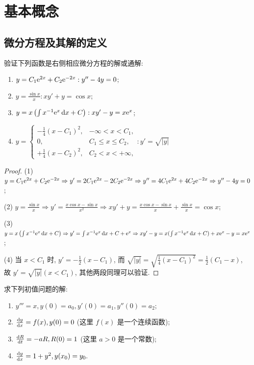 \chapter{基本概念}



\section{微分方程及其解的定义}



\begin{exercise}
  验证下列函数是右侧相应微分方程的解或通解:
  \begin{enumerate}[(1)]
  \item $y=C_1\mathrm{e}^{2x}+C_2\mathrm{e}^{-2x}:y''-4y=0$;
  \item $\displaystyle y=\frac{\sin x}{x}:xy'+y=\cos x$;
  \item $y=x\left(\int x^{-1}\mathrm{e}^x\mathop{}\!\mathrm{d} x+C\right):xy'-y=x\mathrm{e}^x$;
  \item $y=\begin{cases}-\frac{1}{4}(x-C_1)^2,&-\infty<x<C_1,\\0,&C_1\leq x\leq C_2,\\+\frac{1}{4}(x-C_2)^2,&C_2<x<+\infty,\end{cases}:y'=\sqrt{|y|}$
  \end{enumerate}
\end{exercise}

\begin{proof}
  (1) $y=C_1\mathrm{e}^{2x}+C_2\mathrm{e}^{-2x}\Rightarrow y'=2C_1\mathrm{e}^{2x}-2C_2\mathrm{e}^{-2x}\Rightarrow y''=4C_1\mathrm{e}^{2x}+4C_2\mathrm{e}^{-2x}\Rightarrow y''-4y=0$;

  (2) $y=\frac{\sin x}{x}\Rightarrow y'=\frac{x\cos x-\sin x}{x^2}\Rightarrow xy'+y=\frac{x\cos x-\sin x}{x}+\frac{\sin x}{x}=\cos x$;

  (3) $y=x\left(\int x^{-1}\mathrm{e}^x\mathop{}\!\mathrm{d} x+C\right)\Rightarrow y'=\int x^{-1}\mathrm{e}^x\mathop{}\!\mathrm{d} x+C+\mathrm{e}^x\Rightarrow xy'-y=x(\int x^{-1}\mathrm{e}^x\mathop{}\!\mathrm{d} x+C)+x\mathrm{e}^x-y=x\mathrm{e}^x$;

  (4) 当 $x<C_1$ 时, $y'=-\frac{1}{2}(x-C_1)$,
  而 $\sqrt{|y|}=\sqrt{\frac{1}{4}(x-C_1)^2}=\frac{1}{2}(C_1-x)$,
  故 $y'=\sqrt{|y|}(x<C_1)$, 其他两段同理可以验证.
\end{proof}



\begin{exercise}
  求下列初值问题的解:
  \begin{enumerate}[(1)]
  \item $y'''=x,y(0)=a_0,y'(0)=a_1,y''(0)=a_2;$
  \item $\frac{\mathop{}\!\mathrm{d} y}{\mathop{}\!\mathrm{d} x}=f(x),y(0)=0$ (这里 $f(x)$ 是一个连续函数);
  \item $\frac{\mathop{}\!\mathrm{d} R}{\mathop{}\!\mathrm{d} t}=-aR,R(0)=1$ (这里 $a>0$ 是一个常数);
  \item $\frac{\mathop{}\!\mathrm{d} y}{\mathop{}\!\mathrm{d} x}=1+y^2,y(x_0)=y_0.$
  \end{enumerate}
\end{exercise}

